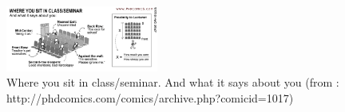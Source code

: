 \documentclass[a4paper]{article}
\begin{document}


  \begin{figure}
  \includegraphics[width=5cm]{fig/phd051608s}
  \caption{Where you sit in class/seminar. And what it says about you (from : http://phdcomics.com/comics/archive.php?comicid=1017)}
  \end{figure}

  
\end{document}
